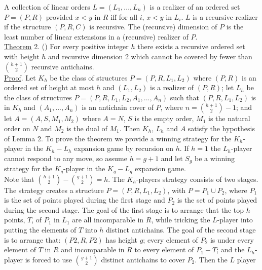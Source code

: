 \documentclass[twoside]{article}
\begin{document}
A collection of linear orders $L = (L_1,..., L_n)$    is a realizer of an ordered set   $P = (P, R)$   provided   $x<y$ in $R$   iff for all $i$, $x<y$ in $L_i$.   $L$   is a recursive   realizer if the structure  $(P,R,C)$ is recursive.    The (recursive) dimension of   $P$   is the least number of linear extensions in a (recursive) realizer of   $P$.\\
\newline
\underline{Theorem} 2.    (\cite{Szemeredi82})     For every positive integer   $h$  there exists a
recursive ordered set with height   $h$   and recursive dimension 2 which cannot
be covered by fewer than $\binom{h+1}{2}$	recursive antichains.\\
\newline
\underline{Proof}.    Let $K_h$	be the class of structures   $P = (P,R,L_1,L_2)$   where   $(P,R)$ is
an ordered set of height at most $h$   and  $(L_1, L_2)$   is a realizer of   $(P,R)$; let
$L_h$   be the class of structures $\bar{P} = (P,R,L_1,L_2,A_1,...,A_n)$   such that
$(P,R,L_1,L_2)$   is in	$K_h$ and   $(A_1,...,A_n)$ is an antichain cover of   $P$, where
$n = \binom{h+1}{2}-1$; and let $A = (A,S,M_1,M_2)$ where $A = N$, $S$ is the empty order, $M_1$
is the natural order on   $N$   and	$M_2$ is the dual of  $M_1$.   Then   $K_h$, $L_h$ and
$A$   satisfy the hypothesis of Lemma 2.   To prove the theorem we provide a winning strategy for the   $K_h$-player in the  $K_h - L_h$   expansion game by recursion on   $h$.    If   $h=1$    the   $L_h$-player cannot respond to any move, so
assume $h = g+1$ and   let  $S_g$     be a winning strategy for the   $K_g$-player in the $K_g - L_g$   expansion game.\\
Note that	$\binom{h+1}{2}	- \binom{g+1}{2} = h$. The   $K_h$-players     strategy consists of two
stages.    The strategy creates a structure   $P = (P,R,L_1,L_2)$, with   $P = P_1 \cup P_2$, where   $P_1$ is the set of points played during the first stage and   $P_2$   is the set of points played during the second stage.   
The goal of the first stage is to arrange that the top   $h$   points, $T$, of   $P_1$   in   $L_1$   are all incomparable in $R$, while tricking the   $L$-player into putting the elements of   $T$   into $h$ distinct antichains.   
The goal of the second stage is to arrange that: $(P2,R,P2)$   has height   $g$; every element of   $P_2$   is under every element
of $T$ in   $R$   and incomparable in   $R$  to every element of   $P_1 - T$;   and the $L_h$-player
\newpage
%
%
is forced to use $\binom{g+1}{2}$	distinct antichains to cover $P_2$.	Then the   $L$ player
\end{document}
